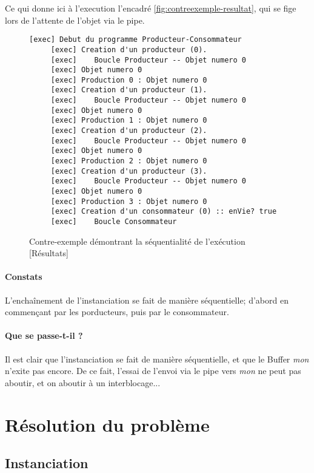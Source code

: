 \documentclass[a4paper,11pt,french]{report}
\begin{document}
Ce qui donne ici à l'execution l'encadré \vref{fig:contreexemple-resultat}, qui se fige lors de l'attente de l'objet via le pipe.

\begin{figure}[h]
\begin{lstlisting}[frame=trBL]
     [exec] Debut du programme Producteur-Consommateur
     [exec] Creation d'un producteur (0).
     [exec]    Boucle Producteur -- Objet numero 0
     [exec] Objet numero 0
     [exec] Production 0 : Objet numero 0
     [exec] Creation d'un producteur (1).
     [exec]    Boucle Producteur -- Objet numero 0
     [exec] Objet numero 0
     [exec] Production 1 : Objet numero 0
     [exec] Creation d'un producteur (2).
     [exec]    Boucle Producteur -- Objet numero 0
     [exec] Objet numero 0
     [exec] Production 2 : Objet numero 0
     [exec] Creation d'un producteur (3).
     [exec]    Boucle Producteur -- Objet numero 0
     [exec] Objet numero 0
     [exec] Production 3 : Objet numero 0
     [exec] Creation d'un consommateur (0) :: enVie? true
     [exec]    Boucle Consommateur
\end{lstlisting}
\caption{Contre-exemple démontrant la séquentialité de l'exécution [Résultats]}
\label{fig:contreexemple-resultat}
\end{figure}

\paragraph{Constats} L'encha\^inement de l'instanciation se fait de manière séquentielle; d'abord en commençant par les porducteurs, puis par le consommateur.

\paragraph{Que se passe-t-il ?} Il est clair que l'instanciation se fait de manière séquentielle, et que le Buffer \textit{mon} n'exite pas encore. De ce fait, l'essai de l'envoi via le pipe vers \textit{mon} ne peut pas aboutir, et on aboutir à un interblocage...

\section{Résolution du problème}
\subsection{Instanciation}
\end{document}
